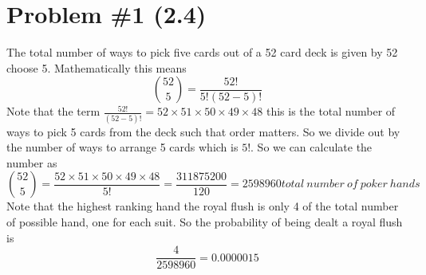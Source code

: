 \documentclass[11pt]{article}
\numberwithin{equation}{section}
\begin{document}


\section{Problem \#1 (2.4)}
The total number of ways to pick five cards out of a 52 card deck is given by 52 choose 5. Mathematically this means
$${52\choose 5} = \frac{52!}{5!(52-5)!}$$
Note that the term $\frac{52!}{(52-5)!} = 52\times51\times50\times49\times48$ this is the total number of ways to pick 5 cards from the deck such that order matters. So we divide out by the number of ways to arrange 5 cards which is $5!$. So we can calculate the number as
$${52\choose5} = \frac{52\times51\times50\times49\times48}{5!} = \frac{311875200}{120} = 2598960\unit{total\ number\ of\ poker\ hands}$$
Note that the highest ranking hand the royal flush is only 4 of the total number of possible hand, one for each suit. So the probability of being dealt a royal flush is 
$$\frac{4}{2598960} = 0.0000015$$
\end{document}
